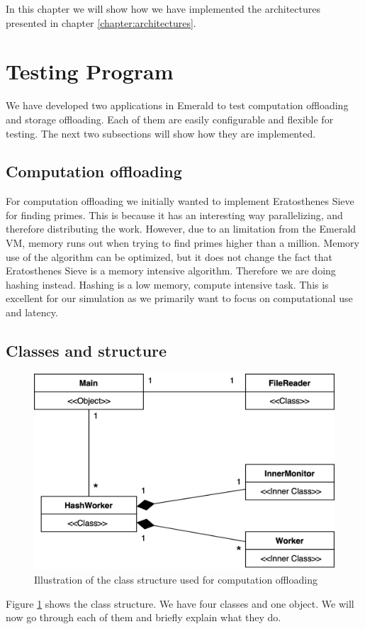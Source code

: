 In this chapter we will show how we have implemented the architectures presented in chapter \ref{chapter:architectures}.

\section{Testing Program}
We have developed two applications in Emerald to test computation offloading and storage offloading. Each of them are easily configurable and flexible for testing. The next two subsections will show how they are implemented.

\subsection{Computation offloading}
For computation offloading we initially wanted to implement Eratosthenes Sieve for finding primes. This is because it has an interesting way parallelizing, and therefore distributing the work. However, due to an limitation from the Emerald VM, memory runs out when trying to find primes higher than a million. Memory use of the algorithm can be optimized, but it does not change the fact that Eratosthenes Sieve is a memory intensive algorithm. Therefore we are doing hashing instead. Hashing is a low memory, compute intensive task. This is excellent for our simulation as we primarily want to focus on computational use and latency.






\subsection{Classes and structure}
\begin{figure}[t]
    \centering
    \includegraphics[scale=0.9]{chapters/implementation/figures/HashWorker_class_diagram.png}
    \caption{Illustration of the class structure used for computation offloading}
    \label{fig:HashWorker_class_diagram}
\end{figure}
Figure \ref{fig:HashWorker_class_diagram} shows the class structure. We have four classes and one object. We will now go through each of them and briefly explain what they do.


